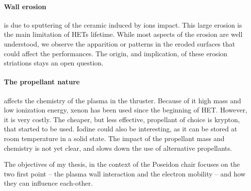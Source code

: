 \paragraph{Wall erosion} is due to sputtering of the ceramic induced by ions impact.
This large erosion is the main limitation of \ac{HET}s lifetime.
While most aspects of the erosion are well understood, we observe the apparition or  patterns in the eroded surfaces that could affect the performances.
The origin, and implication, of these erosion striations stays an open question.

\paragraph{The propellant nature} affects the chemistry of the plasma in the thruster.
Because of it high mass and low ionization energy, xenon has been used since the beginning of \ac{HET}. 
However, it is very costly.
The cheaper, but less effective, propellant of choice is krypton, that started to be used.
Iodine could also be interesting, as it can be stored at room temperature in a solid state.
The impact of the propellant mass and chemistry is not yet clear, and slows down the use of alternative propellants.

\vspace{1em}
The objectives of my thesis, in the context of the {\sc Poseidon} chair focuses on the two first point -- the plasma wall interaction and the electron mobility -- and how they can influence each-other.





